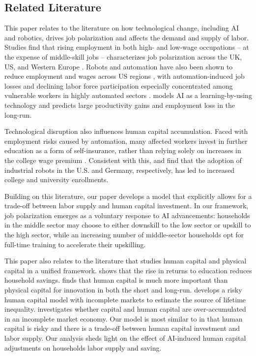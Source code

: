 \documentclass[12pt]{article}
\begin{document}
\subsection{Related Literature}
This paper relates to the literature on how technological change, including AI and robotics, drives job polarization and affects the demand and supply of labor. Studies find that rising employment in both high- and low-wage occupations -- at the expense of middle-skill jobs -- characterizes job polarization across the UK, US, and Western Europe \parencites{Goos2007, Autor2013, Goos2014}. Robots and automation have also been shown to reduce employment and wages across US regions \parencite{Acemoglu2020}, with automation-induced job losses and declining labor force participation especially concentrated among vulnerable workers in highly automated sectors \parencites{Lerch2021, Faber2022}. \citet{wang_artificial_2025} models AI as a learning-by-using technology and predicts large productivity gains and employment loss in the long-run.

Technological disruption also influences human capital accumulation. Faced with employment risks caused by automation, many affected workers invest in further education as a form of self-insurance, rather than relying solely on increases in the college wage premium \parencites{Atkin2016,Beaudry2016}. Consistent with this, \citet{DiGiacomo2023} and \citet{Dauth2021} find that the adoption of industrial robots in the U.S. and Germany, respectively, has led to increased college and university enrollments.

Building on this literature, our paper develops a model that explicitly allows for a trade-off between labor supply and human capital investment. In our framework, job polarization emerges as a voluntary response to AI advancements: households in the middle sector may choose to either downskill to the low sector or upskill to the high sector, while an increasing number of middle-sector households opt for full-time training to accelerate their upskilling.

This paper also relates to the literature that studies human capital and physical capital in a unified framework. \citet{chanda_rise_2008} shows that the rise in returns to education reduces household savings. \citet{waldinger_bombs_2016} finds that human capital is much more important than physical capital for innovation in both the short and long-run. \citet{huggett_sources_2011} develops a risky human capital model with incomplete markets to estimate the source of lifetime inequality. \citet{park_constrained_2018} investigates whether capital and human capital are over-accumulated in an incomplete market economy. Our model is most similar to \citet{huggett_sources_2011} in that human capital is risky and there is a trade-off between human capital investment and labor supply. Our analysis sheds light on the effect of AI-induced human capital adjustments on households labor supply and saving.
\end{document}
